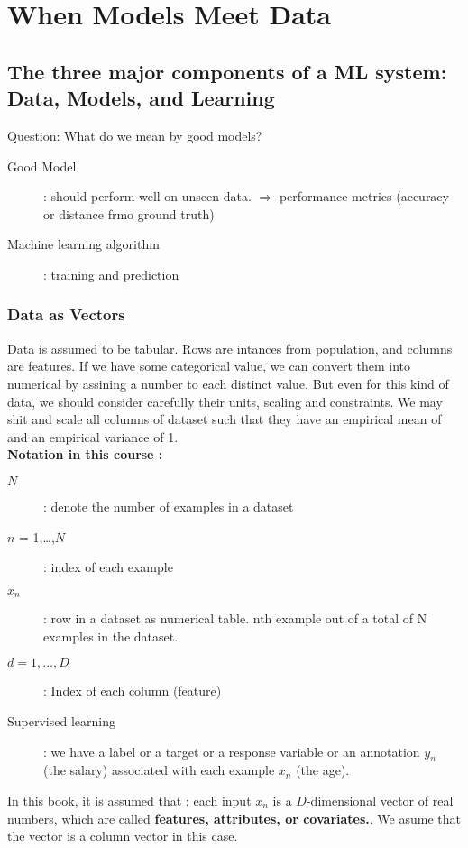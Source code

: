 \chapter{When Models Meet Data}
\section{The three major components of a ML system: Data, Models, and Learning}
Question: What do we mean by good models?

\begin{description}
	\item[Good Model] : should perform well on unseen data. $\Rightarrow$ performance metrics (accuracy or distance frmo ground truth)
	\item[Machine learning algorithm] : training and prediction
\end{description}

\subsection{Data as Vectors}

Data is assumed to be tabular. Rows are intances from population, and columns are features. If we have some categorical value, we can convert them into numerical by assining a number to each distinct value. But even for this kind of data, we should consider carefully their units, scaling and constraints. We may  shit and scale all columns of dataset such that they have an empirical mean of  and an empirical variance of 1. \\

\textbf{Notation in this course : } \\
\begin{description}
	\item[$\textit{N}$] : denote the number of examples in a dataset
	\item[$n$ = 1,\dots,$\textit{N}$] : index of each example
	\item[$x_n$] : row in a dataset as numerical table. nth example out of a total of N examples in the dataset.
	\item[$d = 1,\dots,\textit{D}$] : Index of each column (feature)
	\item[Supervised learning] : we have a label or a target or a response variable or an annotation $y_n$ (the salary) associated with each example $x_n$	(the age).
\end{description}

In this book, it is assumed that : each input $x_n$ is a $D$-dimensional vector of real numbers, which are called \textbf{features, attributes, or covariates.}. We asume that the vector is a column vector in this case.

